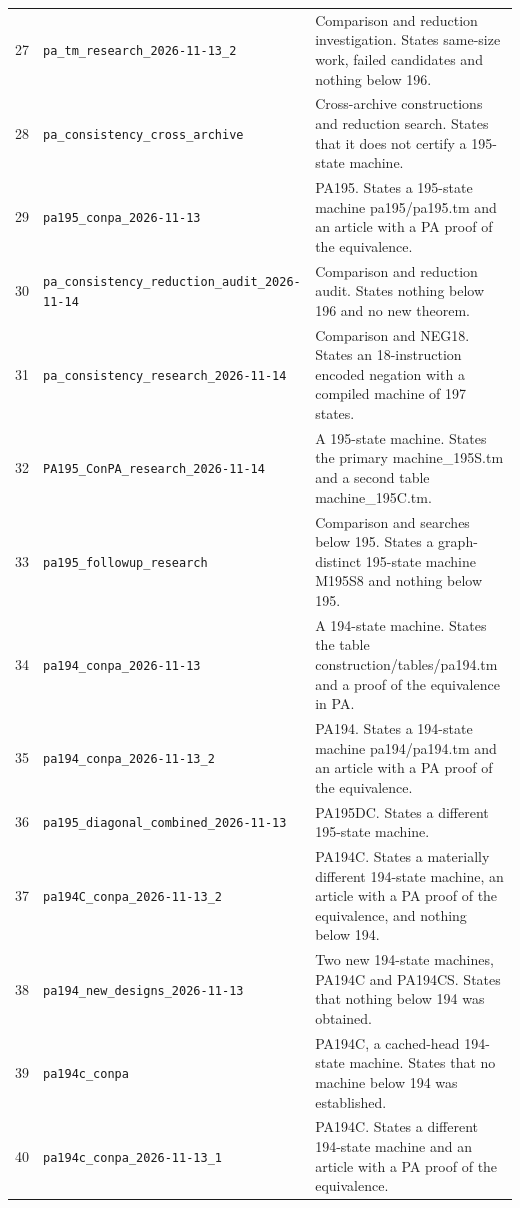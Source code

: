 \begin{longtable}{@{}rp{}p{}@{}}
27 & \nolinkurl{pa_tm_research_2026-11-13_2} & Comparison and reduction investigation. States same-size work, failed candidates and nothing below 196.\\[5pt]
28 & \nolinkurl{pa_consistency_cross_archive} & Cross-archive constructions and reduction search. States that it does not certify a 195-state machine.\\[5pt]
29 & \nolinkurl{pa195_conpa_2026-11-13} & PA195. States a 195-state machine pa195/pa195.tm and an article with a PA proof of the equivalence.\\[5pt]
30 & \nolinkurl{pa_consistency_reduction_audit_2026-11-14} & Comparison and reduction audit. States nothing below 196 and no new theorem.\\[5pt]
31 & \nolinkurl{pa_consistency_research_2026-11-14} & Comparison and NEG18. States an 18-instruction encoded negation with a compiled machine of 197 states.\\[5pt]
32 & \nolinkurl{PA195_ConPA_research_2026-11-14} & A 195-state machine. States the primary machine\_195S.tm and a second table machine\_195C.tm.\\[5pt]
33 & \nolinkurl{pa195_followup_research} & Comparison and searches below 195. States a graph-distinct 195-state machine M195S8 and nothing below 195.\\[5pt]
34 & \nolinkurl{pa194_conpa_2026-11-13} & A 194-state machine. States the table construction/tables/pa194.tm and a proof of the equivalence in PA.\\[5pt]
35 & \nolinkurl{pa194_conpa_2026-11-13_2} & PA194. States a 194-state machine pa194/pa194.tm and an article with a PA proof of the equivalence.\\[5pt]
36 & \nolinkurl{pa195_diagonal_combined_2026-11-13} & PA195DC. States a different 195-state machine.\\[5pt]
37 & \nolinkurl{pa194C_conpa_2026-11-13_2} & PA194C. States a materially different 194-state machine, an article with a PA proof of the equivalence, and nothing below 194.\\[5pt]
38 & \nolinkurl{pa194_new_designs_2026-11-13} & Two new 194-state machines, PA194C and PA194CS. States that nothing below 194 was obtained.\\[5pt]
39 & \nolinkurl{pa194c_conpa} & PA194C, a cached-head 194-state machine. States that no machine below 194 was established.\\[5pt]
40 & \nolinkurl{pa194c_conpa_2026-11-13_1} & PA194C. States a different 194-state machine and an article with a PA proof of the equivalence.\\[5pt]

\end{longtable}
